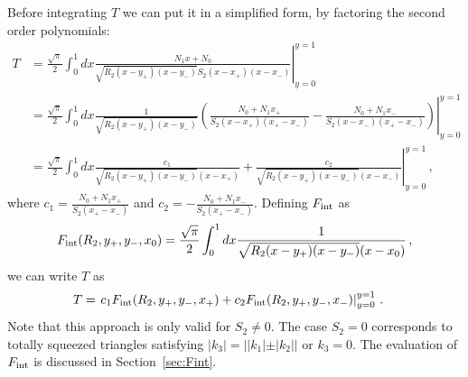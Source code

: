 \documentclass[twoside]{article}
\begin{document}
Before integrating $T$ we can put it in a simplified form, by factoring the second order polynomials:
\begin{align}
  T &=  \frac{\sqrt{\pi}}{2}\int_0^1 dx \left. \frac{N_1 x + N_0}{\sqrt{R_2(x - y_+)(x - y_-)}S_2(x - x_+)(x - x_-)} \right|^{y = 1}_{y = 0}\\
&= \frac{\sqrt{\pi}}{2}\int_0^1 dx \left. \frac{1}{\sqrt{R_2(x - y_+)(x - y_-)}}\left(\frac{N_0+N_1 x_+}{S_2(x - x_+)(x_+ - x_-)} - \frac{N_0+N_1 x_-}{S_2(x - x_-)(x_+ - x_-)}\right) \right|^{y = 1}_{y = 0} \\
\label{eq:Tsamefinal}
&= \frac{\sqrt{\pi}}{2}\int_0^1 dx \left. \frac{c_1}{\sqrt{R_2(x - y_+)(x - y_-)}(x-x_+)}+\frac{c_2}{\sqrt{R_2(x - y_+)(x - y_-)}(x-x_-)} \right|^{y = 1}_{y = 0} \,, 
\end{align}
where $c_1 = \frac{N_0+N_1 x_+}{S_2(x_+ - x_-)}$ and $c_2 = - \frac{N_0+N_1 x_-}{S_2(x_+ - x_-)}$. Defining $F_{\rm int}$ as 
\begin{equation}
\label{eq:Fint}
F_{\rm int}(R_2, y_+, y_-, x_0) = \frac{\sqrt{\pi}}{2}\int_0^1 dx \frac{1}{\sqrt{R_2(x - y_+)(x - y_-)}(x-x_0)}\,,
\end{equation}
we can write $T$ as 
\begin{align}  
T &= \left.c_1 F_{\rm int}(R_2, y_+, y_-, x_+) + c_2 F_{\rm int}(R_2, y_+, y_-, x_-)\right|^{y = 1}_{y = 0}\,.
\end{align}
Note that this approach is only valid for $S_2 \neq 0$. The case $S_2=0$ corresponds to totally squeezed triangles satisfying $|k_3| = ||k_1| \pm |k_2||$ or $k_3 = 0$.
The evaluation of $F_{\rm int}$ is discussed in Section~\ref{sec:Fint}.
\end{document}
